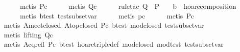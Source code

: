 \begin{isabellebody}
\ \ \ \ \isamarkupfalse%
\ {}metis\ Pc{}\isanewline
\ \ \ \ \isamarkupfalse%
\ {}metis\ Qc{}\isanewline
\ \ \ \ \isamarkupfalse%
\ {}rule{}tac\ Q\ {}\ {}P\ {}\ {}{}\ {}\ b{}{}\ \ hoare{}composition{}\isanewline
\ \ \ \ \isamarkupfalse%
\ {}metis\ b{}test\ test{}subset{}var{}\isanewline
\ \ \ \ \isamarkupfalse%
\ {}metis\ pc{}\isanewline
\ \ \ \ \isamarkupfalse%
\ {}metis\ Pc{}\isanewline
\ \ \ \ \isamarkupfalse%
\ {}metis\ A{}meet{}closed\ A{}top{}closed\ Pc\ b{}test\ mod{}closed\ test{}subset{}var{}\isanewline
\ \ \ \ \isamarkupfalse%
\ {}metis\ {}lifting{}\ Qc{}\isanewline
\ \ \ \ \isamarkupfalse%
\ {}metis\ A{}eq{}refl\ Pc\ b{}test\ hoare{}triple{}def\ mod{}closed\ mod{}test\ test{}subset{}var{}\isanewline

\end{isabellebody}
